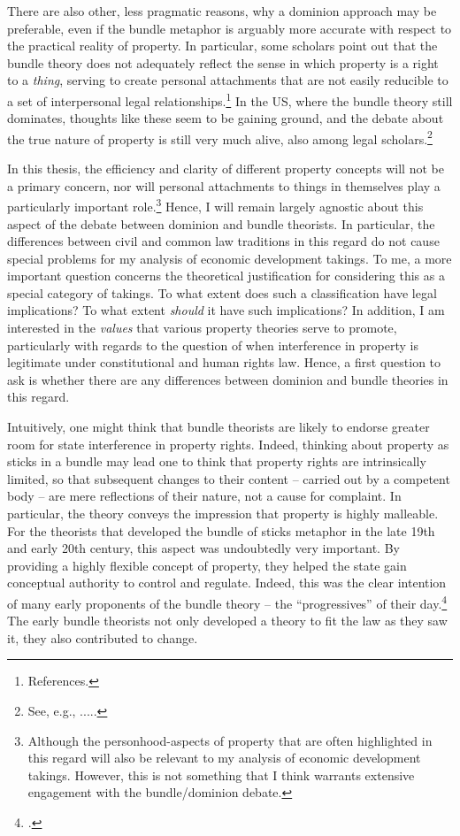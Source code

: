 There are also other, less pragmatic reasons, why a dominion approach may be preferable, even if the bundle metaphor is arguably more accurate with respect to the practical reality of property. In particular, some scholars point out that the bundle theory does not adequately reflect the sense in which property is a right to a {\it thing}, serving to create personal attachments that are not easily reducible to a set of interpersonal legal relationships.\footnote{References.} In the US, where the bundle theory still dominates, thoughts like these seem to be gaining ground, and the debate about the true nature of property is still very much alive, also among legal scholars.\footnote{See, e.g., .....}

In this thesis, the efficiency and clarity of different property concepts will not be a primary concern, nor will personal attachments to things in themselves play a particularly important role.\footnote{Although the personhood-aspects of property that are often highlighted in this regard will also be relevant to my analysis of economic development takings. However, this is not something that I think warrants extensive engagement with the bundle/dominion debate.} Hence, I will remain largely agnostic about this aspect of the debate between dominion and bundle theorists. In particular, the differences between civil and common law traditions in this regard do not cause special problems for my analysis of economic development takings. To me, a more important question concerns the theoretical justification for considering this as a special category of takings. To what extent does such a classification have legal implications? To what extent {\it should} it have such implications? In addition, I am interested in the {\it values} that various property theories serve to promote, particularly with regards to the question of when interference in property is legitimate under constitutional and human rights law. Hence, a first question to ask is whether there are any differences between dominion and bundle theories in this regard.

Intuitively, one might think that bundle theorists are likely to endorse greater room for state interference in property rights. Indeed, thinking about property as sticks in a bundle may lead one to think that property rights are intrinsically limited, so that subsequent changes to their content -- carried out by a competent body -- are mere reflections of their nature, not a cause for complaint. In particular, the theory conveys the impression that property is highly malleable. For the theorists that developed the bundle of sticks metaphor in the late 19th and early 20th century, this aspect was undoubtedly very important. By providing a highly flexible concept of property, they helped the state gain conceptual authority to control and regulate. Indeed, this was the clear intention of many early proponents of the bundle theory -- the ``progressives'' of their day.\footcite[195]{klein11} The early bundle theorists not only developed a theory to fit the law as they saw it, they also contributed to change.

